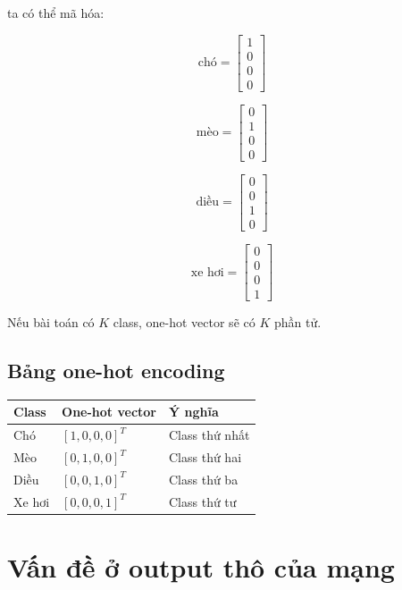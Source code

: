 \documentclass[12pt,a4paper]{report}
\begin{document}
ta có thể mã hóa:

\[
    \text{chó}
    =
    \begin{bmatrix}
    1\\0\\0\\0
    \end{bmatrix}
\]

\[
    \text{mèo}
    =
    \begin{bmatrix}
    0\\1\\0\\0
    \end{bmatrix}
\]

\[
    \text{diều}
    =
    \begin{bmatrix}
    0\\0\\1\\0
    \end{bmatrix}
\]

\[
    \text{xe hơi}
    =
    \begin{bmatrix}
    0\\0\\0\\1
    \end{bmatrix}
\]

\begin{ghinho}
Nếu bài toán có $K$ class, one-hot vector sẽ có $K$ phần tử.
\end{ghinho}

\section{Bảng one-hot encoding}

\begin{center}
\begin{tabular}{lll}
\toprule
Class & One-hot vector & Ý nghĩa \\
\midrule
Chó & $[1,0,0,0]^T$ & Class thứ nhất \\
Mèo & $[0,1,0,0]^T$ & Class thứ hai \\
Diều & $[0,0,1,0]^T$ & Class thứ ba \\
Xe hơi & $[0,0,0,1]^T$ & Class thứ tư \\
\bottomrule
\end{tabular}
\end{center}

\chapter{Vấn đề ở output thô của mạng}
\end{document}
